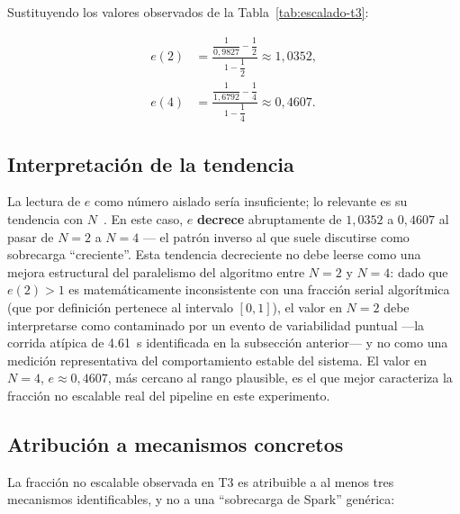 \documentclass[11pt,a4paper]{article}
\begin{document}
    Sustituyendo los valores observados de la Tabla~\ref{tab:escalado-t3}:

    \begin{align}
        e(2) &= \frac{\dfrac{1}{0{,}9827} - \dfrac{1}{2}}{1 - \dfrac{1}{2}} \approx 1{,}0352,
        \label{eq:e2} \\
        e(4) &= \frac{\dfrac{1}{1{,}6792} - \dfrac{1}{4}}{1 - \dfrac{1}{4}} \approx 0{,}4607.
        \label{eq:e4}
    \end{align}

    \subsection{Interpretación de la tendencia}

    La lectura de $e$ como número aislado sería insuficiente; lo relevante
    es su tendencia con $N$~\cite{karpflatt1990}. En este caso, $e$
    \textbf{decrece} abruptamente de $1{,}0352$ a $0{,}4607$ al pasar de
    $N=2$ a $N=4$ — el patrón inverso al que suele discutirse como
    sobrecarga ``creciente''. Esta tendencia decreciente no debe leerse
    como una mejora estructural del paralelismo del algoritmo entre
    $N=2$ y $N=4$: dado que $e(2) > 1$ es matemáticamente inconsistente
    con una fracción serial algorítmica (que por definición pertenece al
    intervalo $[0,1]$), el valor en $N=2$ debe interpretarse como
    contaminado por un evento de variabilidad puntual —la corrida atípica
    de \SI{4.61}{\second} identificada en la subsección anterior— y no
    como una medición representativa del comportamiento estable del
    sistema. El valor en $N=4$, $e \approx 0{,}4607$, más cercano al rango
    plausible, es el que mejor caracteriza la fracción no escalable real
    del pipeline en este experimento.

    \subsection{Atribución a mecanismos concretos}

    La fracción no escalable observada en T3 es atribuible a al menos tres
    mecanismos identificables, y no a una ``sobrecarga de Spark''
    genérica:
\end{document}
